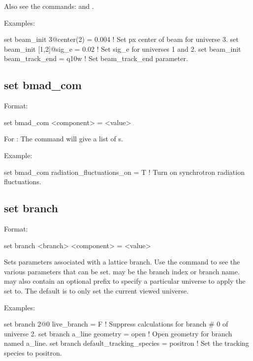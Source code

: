 {{Also see the commands:  and .

Examples:
\begin{example}
  set beam_init 3@center(2) = 0.004   ! Set px center of beam for universe 3.
  set beam_init [1,2]@sig_e = 0.02    ! Set sig_e for universes 1 and 2.
  set beam_init beam_track_end = q10w ! Set beam_track_end parameter.
\end{example}


\subsection{set bmad_com}
\label{s:set.bmad.com}

Format:
\begin{example}
  set bmad_com <component> = <value>
\end{example}

For : The  command will give a list of 
s.

Example:
\begin{example}
  set bmad_com radiation_fluctuations_on = T ! Turn on synchrotron radiation fluctuations.
\end{example}


\subsection{set branch}
\label{s:set.branch}

Format:
\begin{example}
  set branch <branch> <component> = <value>
\end{example}

Sets parameters associated with a lattice branch. Use the  command to see the
various parameters that can be set.  may be the branch index or branch
name.  may also contain an optional  prefix to specify a particular universe
to apply the set to. The default is to only set the current viewed universe.

Examples:
\begin{example}
  set branch 2@0 live_branch = F     ! Suppress calculations for branch \# 0 of universe 2.
  set branch a_line geometry = open  ! Open geometry for branch named a_line.
  set branch default_tracking_species = positron
                                     ! Set the tracking species to positron.
\end{example}

}}
